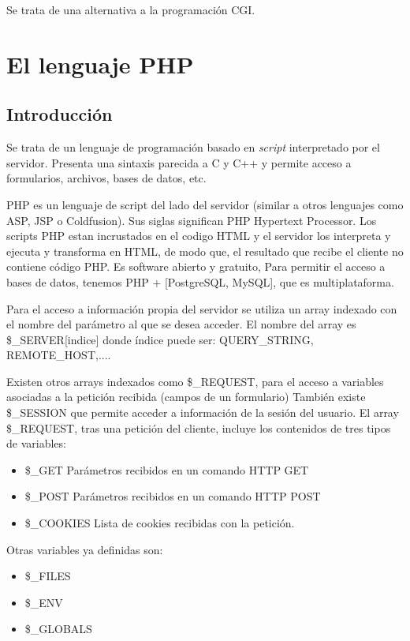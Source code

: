 \documentclass{apuntes}
\begin{document}
Se trata de una alternativa a la programación CGI.

\section{El lenguaje PHP}
\subsection{Introducción}
Se trata de un lenguaje de programación basado en \emph{script} interpretado por el servidor. Presenta una sintaxis parecida a C y C++ y permite acceso a formularios, archivos, bases de datos, etc.

PHP es un lenguaje de script del lado del servidor (similar a otros lenguajes como ASP, JSP o Coldfusion). Sus siglas significan PHP Hypertext Processor. Los scripts PHP estan incrustados en el codigo HTML y el servidor los interpreta y ejecuta y transforma en HTML,  de modo que, el resultado que recibe el cliente no contiene código PHP. Es software abierto y gratuito, Para permitir el acceso a bases de datos, tenemos PHP + [PostgreSQL, MySQL], que es multiplataforma.


Para el acceso a información propia del servidor se utiliza un  array indexado con el nombre del parámetro al que se desea acceder. El nombre del array es \$\_SERVER[indice] donde índice puede ser: QUERY\_STRING, REMOTE\_HOST,....

Existen otros arrays indexados como \$\_REQUEST, para el acceso a variables asociadas a la petición recibida (campos de un formulario)
También existe \$\_SESSION que permite acceder a información de la sesión del usuario. El array \$\_REQUEST, tras una petición del cliente, incluye los contenidos de tres tipos de variables:
\begin{itemize}
\item \$\_GET Parámetros recibidos en un comando HTTP GET
\item \$\_POST Parámetros recibidos en un comando HTTP POST
\item \$\_COOKIES Lista de cookies recibidas con la petición.
\end{itemize}

Otras variables ya definidas son:
\begin{itemize}
\item\$\_FILES
\item\$\_ENV
\item\$\_GLOBALS
\end{itemize}
\end{document}
